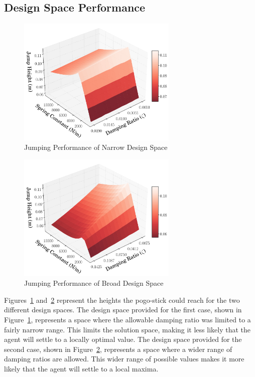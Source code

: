 \documentclass[letterpaper, 10 pt, conference]{ieeeconf}  %
\begin{document}
\subsection{Design Space Performance}
%
\begin{figure}[!t]
        \begin{center}
        \includegraphics[width = 3in]{figures/narrow_design_space/Design_3D_Plot.pdf}  
        \caption{Jumping Performance of Narrow Design Space}
        \label{fig:spring_zeta_height_close}
        \end{center}
\end{figure}
%
\begin{figure}[!t]
        \begin{center}
        \includegraphics[width = 3in]{figures/wide_design_space/Design_3D_Plot.pdf}  
        \caption{Jumping Performance of Broad Design Space}
        \label{fig:spring_zeta_height_far}
        \end{center}
\end{figure}
%

Figures~\ref{fig:spring_zeta_height_close} and~\ref{fig:spring_zeta_height_far} represent the heights the pogo-stick could reach for the two different design spaces. The design space provided for the first case, shown in Figure~\ref{fig:spring_zeta_height_close}, represents a space where the allowable damping ratio was limited to a fairly narrow range. This limits the solution space, making it less likely that the agent will settle to a locally optimal value. The design space provided for the second case, shown in Figure~\ref{fig:spring_zeta_height_far}, represents a space where a wider range of damping ratios are allowed. This wider range of possible values makes it more likely that the agent will settle to a local maxima.
\end{document}
